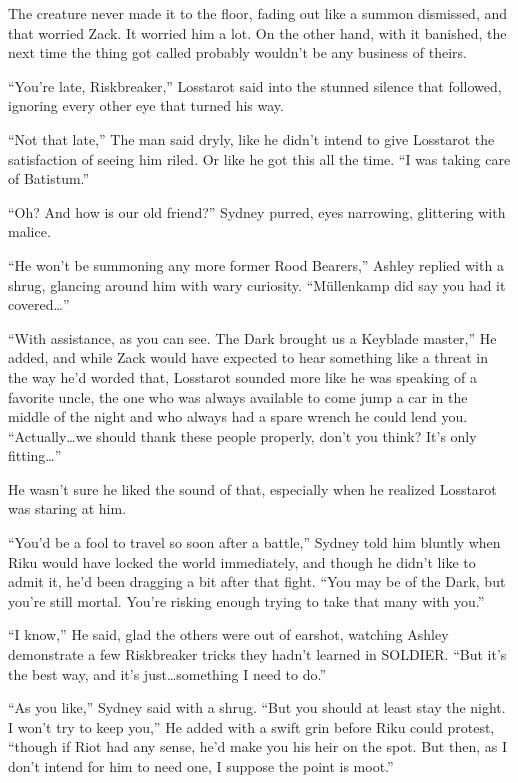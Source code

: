 The creature never made it to the floor, fading out like a summon dismissed, and that worried Zack. It worried him a lot. On the other hand, with it banished, the next time the thing got called probably wouldn't be any business of theirs.
\begin{sloppypar}
``You're late, Riskbreaker,'' Losstarot said into the stunned silence that followed, ignoring every other eye that turned his way.
\end{sloppypar}
``Not that late,'' The man said dryly, like he didn't intend to give Losstarot the satisfaction of seeing him riled. Or like he got this all the time. ``I was taking care of Batistum.''

``Oh? And how is our old friend?'' Sydney purred, eyes narrowing, glittering with malice.

``He won't be summoning any more former Rood Bearers,'' Ashley replied with a shrug, glancing around him with wary curiosity. ``Müllenkamp did say you had it covered\ldots''

``With assistance, as you can see. The Dark brought us a Keyblade master,'' He added, and while Zack would have expected to hear something like a threat in the way he'd worded that, Losstarot sounded more like he was speaking of a favorite uncle, the one who was always available to come jump a car in the middle of the night and who always had a spare wrench he could lend you. ``Actually\ldots we should thank these people properly, don't you think? It's only fitting\ldots''

He wasn't sure he liked the sound of that, especially when he realized Losstarot was staring at him.


\scenechange


``You'd be a fool to travel so soon after a battle,'' Sydney told him bluntly when Riku would have locked the world immediately, and though he didn't like to admit it, he'd been dragging a bit after that fight. ``You may be of the Dark, but you're still mortal. You're risking enough trying to take that many with you.''

``I know,'' He said, glad the others were out of earshot, watching Ashley demonstrate a few Riskbreaker tricks they hadn't learned in SOLDIER. ``But it's the best way, and it's just\ldots something I need to do.''

``As you like,'' Sydney said with a shrug. ``But you should at least stay the night. I won't try to keep you,'' He added with a swift grin before Riku could protest, ``though if Riot had any sense, he'd make you his heir on the spot. But then, as I don't intend for him to need one, I suppose the point is moot.''

